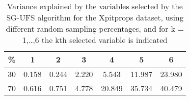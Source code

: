 \begin{table}
	\begin{center}
		\begin{tabular}{c c c c c c c}
			\% & 1 & 2 & 3 & 4 & 5 & 6 \\
			\hline
			30 & 0.158 & 0.244 & 2.220 & 5.543 & 11.987 & 23.980 \\
			70 & 0.616 & 0.751 & 4.778 & 20.849 & 35.734 & 40.479 \\
		\end{tabular}
	\end{center}
	\caption{Variance explained by the variables selected by the SG-UFS algorithm for the Xpitprops dataset, using different random sampling percentages, and for k = 1,..,6 the kth selected variable is indicated}
\end{table}